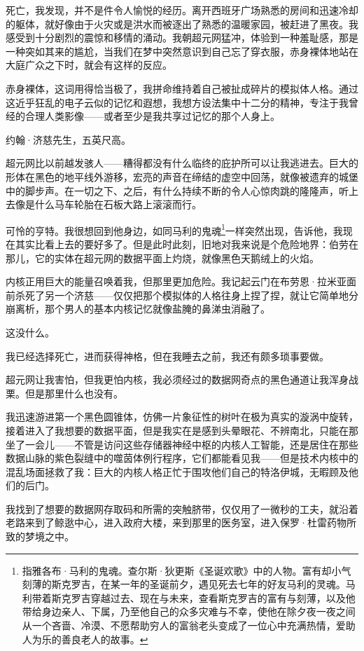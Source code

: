 \documentclass[AutoFakeBold=true]{book}
\begin{document}
{\kaishu 死亡，我发现，并不是件令人愉悦的经历。离开西班牙广场熟悉的房间和迅速冷却的躯体，就好像由于火灾或是洪水而被逐出了熟悉的温暖家园，被赶进了黑夜。我感受到十分剧烈的震惊和移情的涌动。我朝超元网猛冲，体验到一种羞耻感，那是一种突如其来的尴尬，当我们在梦中突然意识到自己忘了穿衣服，赤身裸体地站在大庭广众之下时，就会有这样的反应。

赤身裸体，这词用得恰当极了，我拼命维持着自己被扯成碎片的模拟体人格。通过这近乎狂乱的电子云似的记忆和遐想，我想方设法集中十二分的精神，专注于我曾经的合理人类影像——或者至少是我共享过记忆的那个人身上。

约翰·济慈先生，五英尺高。

超元网比以前越发骇人——糟得都没有什么临终的庇护所可以让我逃进去。巨大的形体在黑色的地平线外游移，宏亮的声音在缔结的虚空中回荡，就像被遗弃的城堡中的脚步声。在一切之下、之后，有什么持续不断的令人心惊肉跳的隆隆声，听上去像是什么马车轮胎在石板大路上滚滚而行。

可怜的亨特。我很想回到他身边，如同马利的鬼魂\footnote{指雅各布·马利的鬼魂。查尔斯·狄更斯《圣诞欢歌》中的人物。富有却小气刻薄的斯克罗吉，在某一年的圣诞前夕，遇见死去七年的好友马利的灵魂。马利带着斯克罗吉穿越过去、现在与未来，查看斯克罗吉的富有与刻薄，以及他带给身边亲人、下属，乃至他自己的众多灾难与不幸，使他在除夕夜一夜之间从一个吝啬、冷漠、不愿帮助穷人的富翁老头变成了一位心中充满热情，爱助人为乐的善良老人的故事。}一样突然出现，告诉他，我现在其实比看上去的要好多了。但是此时此刻，旧地对我来说是个危险地界：伯劳在那儿，它的实体在超元网的数据平面上灼烧，就像黑色天鹅绒上的火焰。

内核正用巨大的能量召唤着我，但那里更加危险。我记起云门在布劳恩·拉米亚面前杀死了另一个济慈——仅仅把那个模拟体的人格往身上捏了捏，就让它简单地分崩离析，那个男人的基本内核记忆就像盐腌的鼻涕虫消融了。

这没什么。

我已经选择死亡，进而获得神格，但在我睡去之前，我还有颇多琐事要做。

超元网让我害怕，但我更怕内核，我必须经过的数据网奇点的黑色通道让我浑身战栗。但是那里什么也没有。

我迅速游进第一个黑色圆锥体，仿佛一片象征性的树叶在极为真实的漩涡中旋转，接着进入了我想要的数据平面，但是我实在是感到头晕眼花、不辨南北，只能在那坐了一会儿——不管是访问这些存储器神经中枢的内核人工智能，还是居住在那些数据山脉的紫色裂缝中的噬茵体例行程序，它们都能看见我——但是技术内核中的混乱场面拯救了我：巨大的内核人格正忙于围攻他们自己的特洛伊城，无暇顾及他们的后门。

我找到了想要的数据网存取码和所需的突触脐带，仅仅用了一微秒的工夫，就沿着老路来到了鲸逖中心，进入政府大楼，来到那里的医务室，进入保罗·杜雷药物所致的梦境之中。

}
\end{document}
